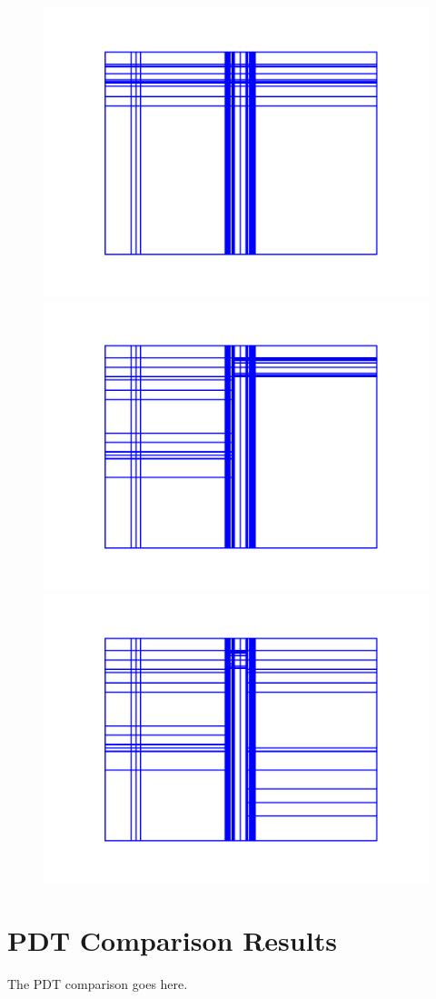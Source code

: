 \begin{figure}[h]
\centering
\includegraphics[scale=0.55]{../../figures/lvl2_suite_0.pdf}
\includegraphics[scale=0.55]{../../figures/lvl2_suite_1.pdf}
\includegraphics[scale=0.55]{../../figures/lvl2_suite_2.pdf}
\end{figure}

\FloatBarrier

\section{PDT Comparison Results}

The PDT comparison goes here.
